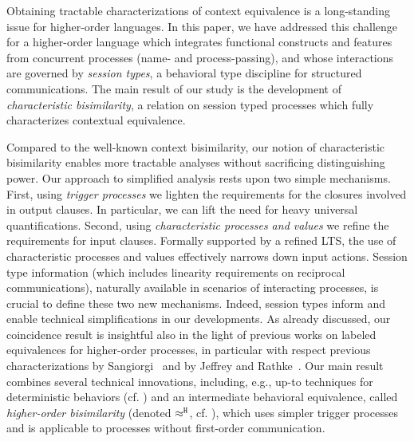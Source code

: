 
Obtaining tractable characterizations of context equivalence 
is a long-standing issue for higher-order  languages. 
In this paper, we have addressed this challenge for a higher-order language 
which integrates functional constructs and  features from concurrent processes (name- and process-passing), and 
whose interactions are governed by \emph{session types}, a behavioral type discipline for structured communications.
The main result of our study is the development of \emph{characteristic bisimilarity}, 
a relation on session typed processes which fully characterizes contextual equivalence.

Compared to 
the well-known 
context bisimilarity, our notion of 
characteristic bisimilarity 
enables more tractable analyses without sacrificing distinguishing power. 
Our approach to simplified analysis rests upon two simple mechanisms. 
First, 
using \emph{trigger processes} 
we lighten the requirements for the closures involved in output clauses. 
In particular, we can lift the need for heavy universal quantifications. 
Second, using \emph{characteristic processes and values} we refine the requirements for input clauses.
Formally supported by a refined LTS, the use of characteristic processes and values effectively narrows down
input actions.
Session type information (which includes linearity requirements on reciprocal communications), naturally available in scenarios of interacting processes, is crucial to define these two new mechanisms. Indeed, session types inform and enable technical simplifications in our developments.
As already discussed, our coincidence result is insightful also in the light of previous works on labeled equivalences 
for higher-order processes, in particular with respect previous characterizations 
by Sangiorgi~\cite{SangiorgiD:expmpa,San96H} and by Jeffrey and Rathke~\cite{JeffreyR05}. Our main result 
combines several technical innovations, including, e.g., 
up-to techniques for deterministic behaviors (cf. )
and an intermediate behavioral equivalence, called \emph{higher-order bisimilarity}
(denoted $\approx^\mathtt{H}$, cf. ), which 
uses simpler trigger processes and 
is applicable to processes without first-order communication. 

